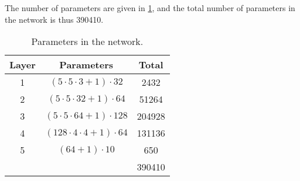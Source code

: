 The number of parameters are given in \cref{tab:task1:parameters}, and the total number of parameters in the network is thus 390410. 

\begin{table}[h!]
  \centering
  \begin{tabular}{|c|c|c|}
    \hline
    Layer & Parameters & Total \\
    \hline
    1 & $(5\cdot5\cdot3 +1)\cdot32$ & 2432 \\
    2 & $(5\cdot5\cdot32+1)\cdot64$ & 51264 \\
    3 & $(5\cdot5\cdot64+1)\cdot128$ & 204928 \\
    4 & $(128\cdot4\cdot4+1)\cdot64$ & 131136 \\
    5 & $(64+1)\cdot10$ & 650 \\
    \hline
     & & 390410 \\
     \hline
  \end{tabular}
  \caption{Parameters in the network.}
  \label{tab:task1:parameters}
\end{table}
